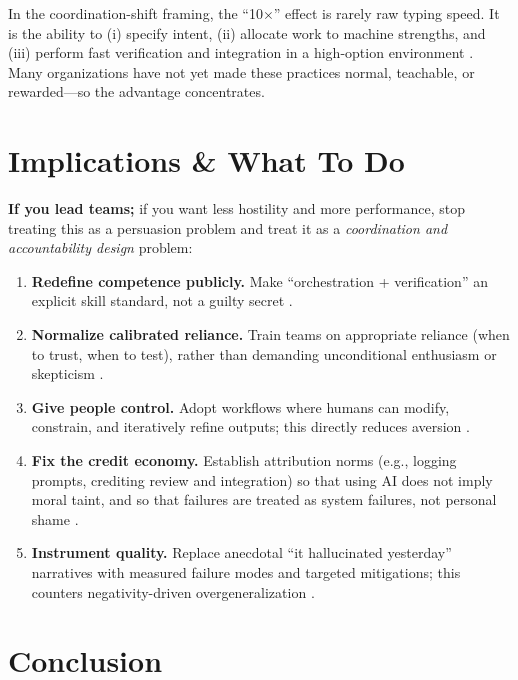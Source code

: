 \documentclass[11pt, a4paper, twocolumn]{article} %
\begin{document}
In the coordination-shift framing, the ``10$\times$'' effect is rarely raw typing speed. It is the ability to (i) specify intent, (ii) allocate work to machine strengths, and (iii) perform fast verification and integration in a high-option environment \citep{Blomgren2025CoordinationShift}. Many organizations have not yet made these practices normal, teachable, or rewarded---so the advantage concentrates.

\section*{Implications \& What To Do}

\textbf{If you lead teams;} if you want less hostility and more performance, stop treating this as a persuasion problem and treat it as a \emph{coordination and accountability design} problem:

\begin{enumerate}[leftmargin=*]
  \item \textbf{Redefine competence publicly.} Make ``orchestration + verification'' an explicit skill standard, not a guilty secret \citep{Blomgren2025CoordinationShift}.
  \item \textbf{Normalize calibrated reliance.} Train teams on appropriate reliance (when to trust, when to test), rather than demanding unconditional enthusiasm or skepticism \citep{LeeSee2004TrustAutomation,ParasuramanSheridanWickens2000Levels}.
  \item \textbf{Give people control.} Adopt workflows where humans can modify, constrain, and iteratively refine outputs; this directly reduces aversion \citep{DietvorstSimmonsMassey2018Overcoming,DeciRyan2000WhatWhy}.
  \item \textbf{Fix the credit economy.} Establish attribution norms (e.g., logging prompts, crediting review and integration) so that using AI does not imply moral taint, and so that failures are treated as system failures, not personal shame \citep{Petriglieri2011UnderThreat,PrenticeMiller1993Pluralistic}.
  \item \textbf{Instrument quality.} Replace anecdotal ``it hallucinated yesterday'' narratives with measured failure modes and targeted mitigations; this counters negativity-driven overgeneralization \citep{BaumeisterEtAl2001Bad,TverskyKahneman1974Heuristics}.
\end{enumerate}

\section*{Conclusion}
\end{document}
